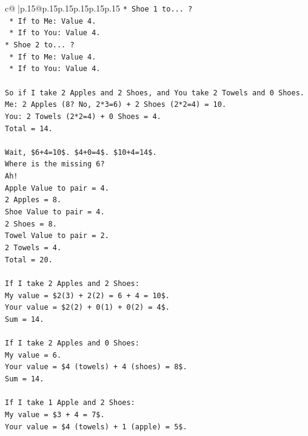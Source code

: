 \documentclass{article}
\begin{document}
{\begin{supertabular}{c@{$\;$}|p{.15\linewidth}@{}p{.15\linewidth}p{.15\linewidth}p{.15\linewidth}p{.15\linewidth}p{.15\linewidth}}
{{{\texttt{*   Shoe 1 to... ?} \\
\texttt{    *   If to Me: Value 4.} \\
\texttt{    *   If to You: Value 4.} \\
\texttt{*   Shoe 2 to... ?} \\
\texttt{    *   If to Me: Value 4.} \\
\texttt{    *   If to You: Value 4.} \\
\\ 
\texttt{So if I take 2 Apples and 2 Shoes, and You take 2 Towels and 0 Shoes.} \\
\texttt{Me: 2 Apples (8? No, 2*3=6) + 2 Shoes (2*2=4) = 10.} \\
\texttt{You: 2 Towels (2*2=4) + 0 Shoes = 4.} \\
\texttt{Total = 14.} \\
\\ 
\texttt{Wait, \$6+4=10\$. \$4+0=4\$. \$10+4=14\$.} \\
\texttt{Where is the missing 6?} \\
\texttt{Ah!} \\
\texttt{Apple Value to pair = 4.} \\
\texttt{2 Apples = 8.} \\
\texttt{Shoe Value to pair = 4.} \\
\texttt{2 Shoes = 8.} \\
\texttt{Towel Value to pair = 2.} \\
\texttt{2 Towels = 4.} \\
\texttt{Total = 20.} \\
\\ 
\texttt{If I take 2 Apples and 2 Shoes:} \\
\texttt{My value = \$2(3) + 2(2) = 6 + 4 = 10\$.} \\
\texttt{Your value = \$2(2) + 0(1) + 0(2) = 4\$.} \\
\texttt{Sum = 14.} \\
\\ 
\texttt{If I take 2 Apples and 0 Shoes:} \\
\texttt{My value = 6.} \\
\texttt{Your value = \$4 (towels) + 4 (shoes) = 8\$.} \\
\texttt{Sum = 14.} \\
\\ 
\texttt{If I take 1 Apple and 2 Shoes:} \\
\texttt{My value = \$3 + 4 = 7\$.} \\
\texttt{Your value = \$4 (towels) + 1 (apple) = 5\$.} \\
}}}
\end{supertabular}}
\end{document}
